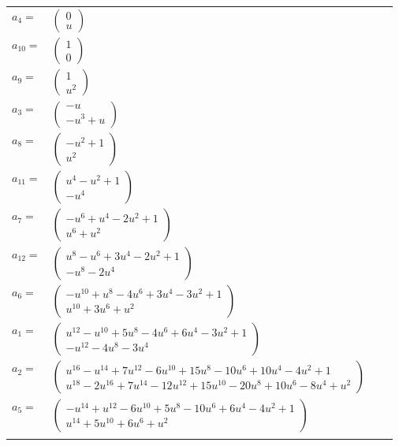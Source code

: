 \documentclass[1p]{elsarticle_modified}
\theoremstyle{definition}
\begin{document}
\begin{tabular}{m{7pt} m{180pt} m{7pt} m{180pt} }
\flushright $a_{4}=$&$\begin{pmatrix}0\\u\end{pmatrix}$ \\
\flushright $a_{10}=$&$\begin{pmatrix}1\\0\end{pmatrix}$ \\
\flushright $a_{9}=$&$\begin{pmatrix}1\\u^2\end{pmatrix}$ \\
\flushright $a_{3}=$&$\begin{pmatrix}- u\\- u^3+u\end{pmatrix}$ \\
\flushright $a_{8}=$&$\begin{pmatrix}- u^2+1\\u^2\end{pmatrix}$ \\
\flushright $a_{11}=$&$\begin{pmatrix}u^4- u^2+1\\- u^4\end{pmatrix}$ \\
\flushright $a_{7}=$&$\begin{pmatrix}- u^6+u^4-2 u^2+1\\u^6+u^2\end{pmatrix}$ \\
\flushright $a_{12}=$&$\begin{pmatrix}u^8- u^6+3 u^4-2 u^2+1\\- u^8-2 u^4\end{pmatrix}$ \\
\flushright $a_{6}=$&$\begin{pmatrix}- u^{10}+u^8-4 u^6+3 u^4-3 u^2+1\\u^{10}+3 u^6+u^2\end{pmatrix}$ \\
\flushright $a_{1}=$&$\begin{pmatrix}u^{12}- u^{10}+5 u^8-4 u^6+6 u^4-3 u^2+1\\- u^{12}-4 u^8-3 u^4\end{pmatrix}$ \\
\flushright $a_{2}=$&$\begin{pmatrix}u^{16}- u^{14}+7 u^{12}-6 u^{10}+15 u^8-10 u^6+10 u^4-4 u^2+1\\u^{18}-2 u^{16}+7 u^{14}-12 u^{12}+15 u^{10}-20 u^8+10 u^6-8 u^4+u^2\end{pmatrix}$ \\
\flushright $a_{5}=$&$\begin{pmatrix}- u^{14}+u^{12}-6 u^{10}+5 u^8-10 u^6+6 u^4-4 u^2+1\\u^{14}+5 u^{10}+6 u^6+u^2\end{pmatrix}$\\&\end{tabular}
\end{document}
